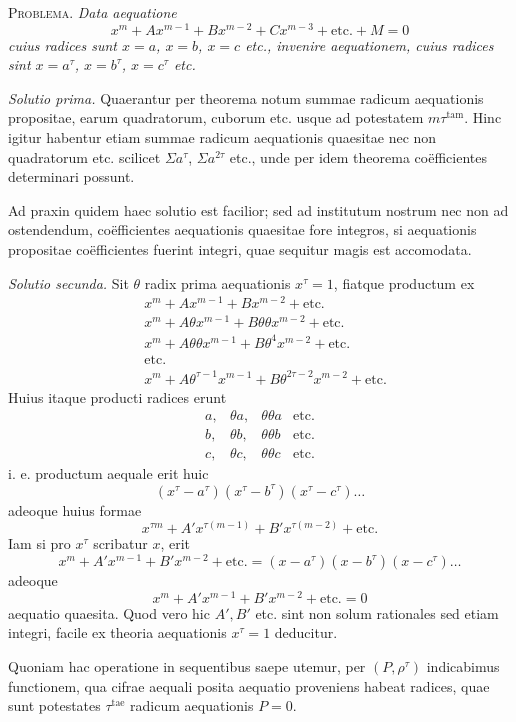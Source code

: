 \textsc{Problema.} \emph{Data aequatione}
\[
x^m+Ax^{m-1}+Bx^{m-2}+Cx^{m-3}+\text{etc.}+M=0
\]
\emph{cuius radices sunt $x=a$, $x=b$, $x=c$ etc., invenire aequationem, cuius radices sint $x=a^\tau$, $x=b^\tau$, $x=c^\tau$ etc.}

\emph{Solutio prima.} Quaerantur per theorema notum summae radicum aequationis propositae, earum quadratorum, cuborum etc. usque ad potestatem $m\tau^{\mathrm{tam}}$. Hinc igitur habentur etiam summae radicum aequationis quaesitae nec non quadratorum etc. scilicet $\Sigma a^\tau$, $\Sigma a^{2\tau}$ etc., unde per idem theorema coëfficientes determinari possunt.

Ad praxin quidem haec solutio est facilior; sed ad institutum nostrum nec non ad ostendendum, coëfficientes aequationis quaesitae fore integros, si aequationis propositae coëfficientes fuerint integri, quae sequitur magis est accomodata.

\emph{Solutio secunda.} Sit $\theta$ radix prima aequationis $x^\tau=1$, fiatque productum ex
\[
\begin{aligned}
&x^m+Ax^{m-1}+Bx^{m-2}+\text{etc.}\\
&x^m+A\theta x^{m-1}+B\theta\theta x^{m-2}+\text{etc.}\\
&x^m+A\theta\theta x^{m-1}+B\theta^4x^{m-2}+\text{etc.}\\
&\text{etc.}\\
&x^m+A\theta^{\tau-1}x^{m-1}+B\theta^{2\tau-2}x^{m-2}+\text{etc.}
\end{aligned}
\]
Huius itaque producti radices erunt
\[
\begin{array}{llll}
a,&\theta a,&\theta\theta a&\text{etc.}\\
b,&\theta b,&\theta\theta b&\text{etc.}\\
c,&\theta c,&\theta\theta c&\text{etc.}
\end{array}
\]
i. e. productum aequale erit huic
\[
(x^\tau-a^\tau)(x^\tau-b^\tau)(x^\tau-c^\tau)\ldots
\]
adeoque huius formae
\[
x^{\tau m}+A'x^{\tau(m-1)}+B'x^{\tau(m-2)}+\text{etc.}
\]
Iam si pro $x^\tau$ scribatur $x$, erit
\[
x^m+A'x^{m-1}+B'x^{m-2}+\text{etc.}=(x-a^\tau)(x-b^\tau)(x-c^\tau)\ldots
\]
adeoque
\[
x^m+A'x^{m-1}+B'x^{m-2}+\text{etc.}=0
\]
aequatio quaesita. Quod vero hic $A',B'$ etc. sint non solum rationales sed etiam integri, facile ex theoria aequationis $x^\tau=1$ deducitur.

Quoniam hac operatione in sequentibus saepe utemur, per $(P,\rho^\tau)$ 
indicabimus functionem, qua cifrae aequali posita aequatio proveniens habeat radices, quae sunt potestates $\tau^{\mathrm{tae}}$ radicum aequationis $P=0$.

